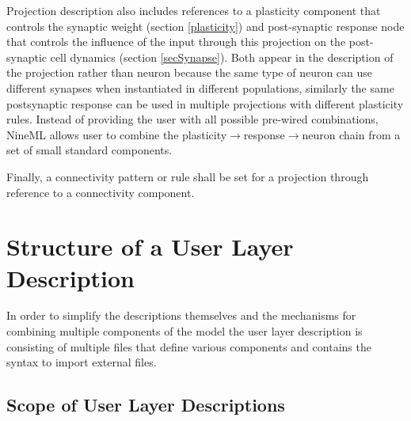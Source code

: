 \documentclass{article}
\begin{document}
Projection description also includes references to a plasticity component
that controls the synaptic weight (section \ref{plasticity}) and post-synaptic
response node that controls the influence of the input through this projection
on the post-synaptic cell dynamics (section \ref{secSynapse}). Both appear in
the description of the projection rather than neuron because the same type of
neuron can use different synapses when instantiated in different populations,
similarly the same postsynaptic response can be used in multiple projections
with different plasticity rules. Instead of providing the user with all
possible pre-wired combinations, NineML allows user to combine the
plasticity$\rightarrow$response$\rightarrow$neuron chain from a set of small
standard components.

Finally, a connectivity pattern or rule shall be set for a projection through
reference to a connectivity component.

\section{Structure of a User Layer Description}

In order to simplify the descriptions themselves and the mechanisms for
combining multiple components of the model the user layer description
is consisting of multiple files that define various components and
contains the syntax to import external files.

\subsection{Scope of User Layer Descriptions}
\label{scope}
\end{document}

